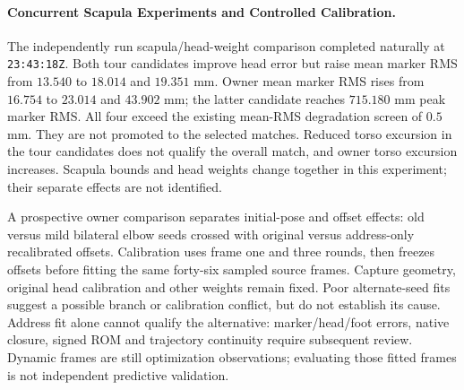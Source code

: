 \documentclass[11pt,a4paper]{article}
\begin{document}
\paragraph{Concurrent Scapula Experiments and Controlled Calibration.}
The independently run scapula/head-weight comparison completed naturally
at \texttt{23:43:18Z}. Both tour candidates improve head error but raise
mean marker RMS from $13.540$ to $18.014$ and $19.351$ mm. Owner mean
marker RMS rises from $16.754$ to $23.014$ and $43.902$ mm; the latter
candidate reaches $715.180$ mm peak marker RMS. All four exceed the
existing mean-RMS degradation screen of $0.5$ mm. They are not promoted
to the selected matches. Reduced torso excursion in the tour candidates
does not qualify the overall match, and owner torso excursion increases.
Scapula bounds and head weights change together in this experiment;
their separate effects are not identified.

A prospective owner comparison separates initial-pose and offset effects:
old versus mild bilateral elbow seeds crossed with original versus
address-only recalibrated offsets. Calibration uses frame one and three
rounds, then freezes offsets before fitting the same forty-six sampled
source frames. Capture geometry, original head calibration and other
weights remain fixed. Poor alternate-seed fits suggest a possible branch
or calibration conflict, but do not establish its cause. Address fit alone
cannot qualify the alternative: marker/head/foot errors, native closure,
signed ROM and trajectory continuity require subsequent review. Dynamic
frames are still optimization observations; evaluating those fitted
frames is not independent predictive validation.
\end{document}
